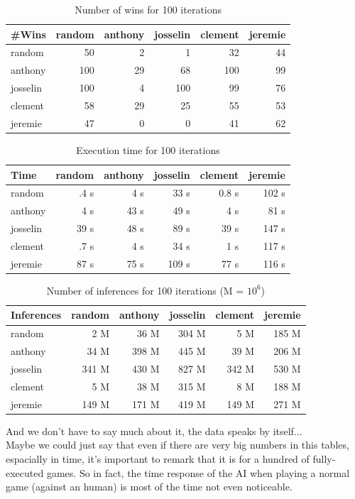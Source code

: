 \documentclass[a4paper,11pt]{article}
\newcommand{\mytable}[3]{
	\begin{table}[ht]
		\begin{center}
			\begin{tabular}{#2}
				#3
			\end{tabular}
		\caption{#1}
		\end{center}
	\end{table}
}
\begin{document}
			\mytable{Number of wins for 100 iterations}{|l||r|r|r|r|r|}{
				\hline
				\#Wins		& random	& anthony	& josselin	& clement	& jeremie	\\\hline\hline
				random		& 50		& 2			& 1			& 32		& 44		\\\hline
				anthony		& 100		& 29		& 68		& 100		& 99		\\\hline
				josselin	& 100		& 4			& 100		& 99		& 76		\\\hline
				clement		& 58		& 29		& 25		& 55		& 53		\\\hline
				jeremie		& 47		& 0			& 0			& 41		& 62		\\\hline
			}

			\mytable{Execution time for 100 iterations}{|l||r|r|r|r|r|}{
				\hline
				Time		& random	& anthony	& josselin		& clement	& jeremie	\\\hline\hline
				random		& .4 s		& 4 s		& 33 s			& 0.8 s		& 102 s		\\\hline
				anthony		& 4 s		& 43 s		& 49 s			& 4 s		& 81 s		\\\hline
				josselin	& 39 s		& 48 s		& 89 s			& 39 s		& 147 s		\\\hline
				clement		& .7 s		& 4 s		& 34 s			& 1 s		& 117 s		\\\hline
				jeremie		& 87 s		& 75 s		& 109 s			& 77 s		& 116 s		\\\hline
			}

			\mytable{Number of inferences for 100 iterations (M = $10^6$)}{|l||r|r|r|r|r|}{
				\hline
				Inferences		& random	& anthony	& josselin	& clement	& jeremie	\\\hline\hline
				random			& 2 M		& 36 M		& 304 M		& 5 M		& 185 M		\\\hline
				anthony			& 34 M		& 398 M		& 445 M		& 39 M		& 206 M		\\\hline
				josselin		& 341 M		& 430 M		& 827 M		& 342 M		& 530 M		\\\hline
				clement			& 5 M		& 38 M		& 315 M		& 8 M		& 188 M		\\\hline
				jeremie			& 149 M		& 171 M		& 419 M		& 149 M		& 271 M		\\\hline
			}

			And we don't have to say much about it, the data speaks by itself... \\
			Maybe we could just say that even if there are very big numbers in this tables, espacially in time, it's important to remark that it is for a hundred of fully-executed games. So in fact, the time response of the AI when playing a normal game (against an human) is most of the time not even noticeable.
		
\end{document}
